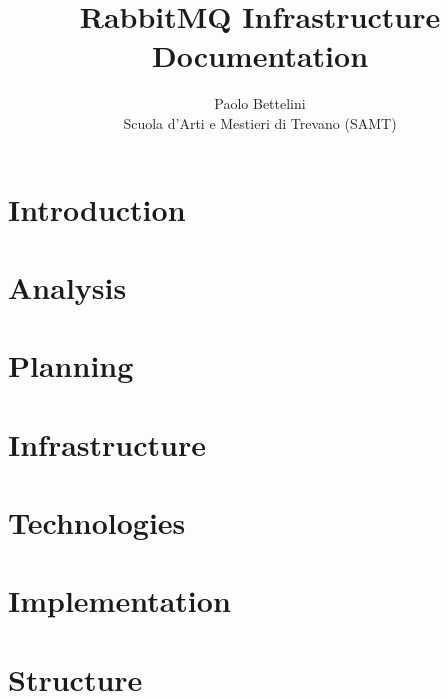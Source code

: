 \documentclass[a4paper]{article}
\title{%
    RabbitMQ Infrastructure \\
    \large Documentation
}
\author{%
    Paolo Bettelini \\
    \large Scuola d'Arti e Mestieri di Trevano (SAMT)}
\date{}
\begin{document}
\maketitle

\pagebreak

\tableofcontents

\pagebreak

\section{Introduction}



\pagebreak

\section{Analysis}



\pagebreak

\section{Planning}



\pagebreak

\section{Infrastructure}



\pagebreak

\section{Technologies}



\pagebreak

\section{Implementation}



\pagebreak

\section{Structure}
\end{document}
